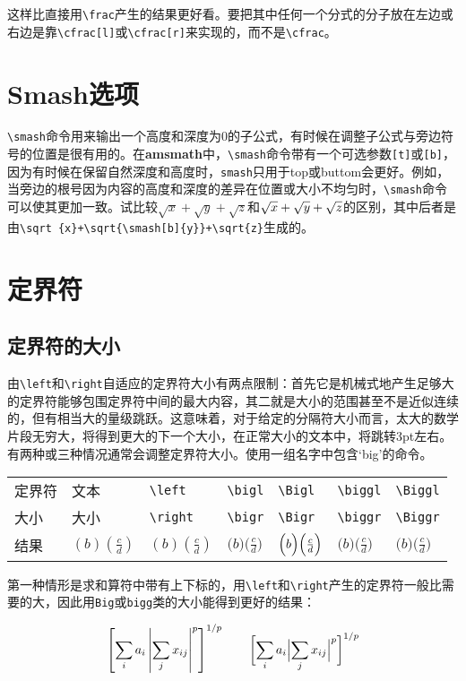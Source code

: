 \documentclass[openany]{ctexbook}
\begin{document}
这样比直接用\verb|\frac|产生的结果更好看。要把其中任何一个分式的分子放在左边或右边是靠\verb|\cfrac[l]|或\verb|\cfrac[r]|来实现的，而不是\verb|\cfrac|。
\section{Smash选项}
\verb|\smash|命令用来输出一个高度和深度为0的子公式，有时候在调整子公式与旁边符号的位置是很有用的。在{\bfseries amsmath}中，\verb|\smash|命令带有一个可选参数\verb|[t]|或\verb|[b]|，因为有时候在保留自然深度和高度时，\verb|smash|只用于top或buttom会更好。例如，当旁边的根号因为内容的高度和深度的差异在位置或大小不均匀时，\verb|\smash|命令可以使其更加一致。试比较$\sqrt x+\sqrt y+\sqrt z$和$\sqrt {x}+\sqrt{\smash[b]{y}}+\sqrt{z}$的区别，其中后者是由\verb|\sqrt {x}+\sqrt{\smash[b]{y}}+\sqrt{z}|生成的。
\section{定界符}
\subsection{定界符的大小}
由\verb|\left|和\verb|\right|自适应的定界符大小有两点限制：首先它是机械式地产生足够大的定界符能够包围定界符中间的最大内容，其二就是大小的范围甚至不是近似连续的，但有相当大的量级跳跃。这意味着，对于给定的分隔符大小而言，太大的数学片段无穷大，将得到更大的下一个大小，在正常大小的文本中，将跳转3pt左右。有两种或三种情况通常会调整定界符大小。使用一组名字中包含`big'的命令。

\begin{tabular}{l|llllll}
定界符 &文本&\verb|\left|&\verb|\bigl|&\verb|\Bigl|&\verb|\biggl|&\verb|\Biggl|\\
大小&大小     &\verb|\right|&\verb|\bigr|&\verb|\Bigr|&\verb|\biggr|&\verb|\Biggr|\\
\hline
结果&$(b)(\frac cd)$&$\left(b\right)\left(\frac cd\right)$&$\bigl(b\bigr)\bigl(\frac cd\bigr)$&$\Bigl(b\Bigr)\Bigl(\frac cd\Bigr)$&$\biggl(b\biggr)\biggl(\frac cd\biggr)$
&$\Biggl(b\Biggr)\Biggl(\frac cd\Biggr)$
\end{tabular}

第一种情形是求和算符中带有上下标的，用\verb|\left|和\verb|\right|产生的定界符一般比需要的大，因此用\verb|Big|或\verb|bigg|类的大小能得到更好的结果：
\begin{tcblisting}{}
\[\left[\sum_i a_i\left\lvert\sum_j x_{ij}\right\rvert^p\right]^{1/p}\qquad\biggl[\sum_i a_i\Bigl\lvert\sum_j x_{ij}\Bigr\rvert^p\biggr]^{1/p}\]
\end{tcblisting}
\end{document}

